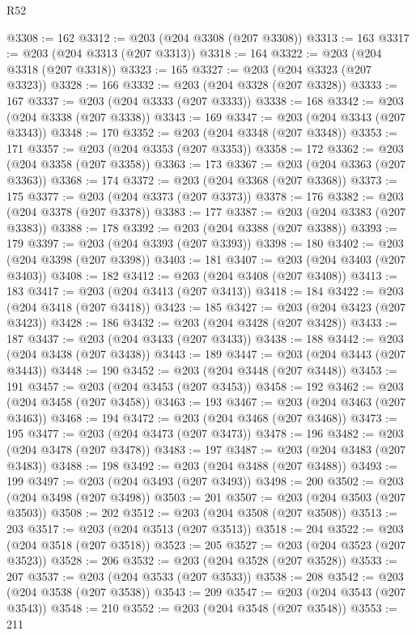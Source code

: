 \begin{lexlean}{R52}
\begin{coremodule}
@3308 := 162
@3312 := @203 (@204 @3308 (@207 @3308))
@3313 := 163
@3317 := @203 (@204 @3313 (@207 @3313))
@3318 := 164
@3322 := @203 (@204 @3318 (@207 @3318))
@3323 := 165
@3327 := @203 (@204 @3323 (@207 @3323))
@3328 := 166
@3332 := @203 (@204 @3328 (@207 @3328))
@3333 := 167
@3337 := @203 (@204 @3333 (@207 @3333))
@3338 := 168
@3342 := @203 (@204 @3338 (@207 @3338))
@3343 := 169
@3347 := @203 (@204 @3343 (@207 @3343))
@3348 := 170
@3352 := @203 (@204 @3348 (@207 @3348))
@3353 := 171
@3357 := @203 (@204 @3353 (@207 @3353))
@3358 := 172
@3362 := @203 (@204 @3358 (@207 @3358))
@3363 := 173
@3367 := @203 (@204 @3363 (@207 @3363))
@3368 := 174
@3372 := @203 (@204 @3368 (@207 @3368))
@3373 := 175
@3377 := @203 (@204 @3373 (@207 @3373))
@3378 := 176
@3382 := @203 (@204 @3378 (@207 @3378))
@3383 := 177
@3387 := @203 (@204 @3383 (@207 @3383))
@3388 := 178
@3392 := @203 (@204 @3388 (@207 @3388))
@3393 := 179
@3397 := @203 (@204 @3393 (@207 @3393))
@3398 := 180
@3402 := @203 (@204 @3398 (@207 @3398))
@3403 := 181
@3407 := @203 (@204 @3403 (@207 @3403))
@3408 := 182
@3412 := @203 (@204 @3408 (@207 @3408))
@3413 := 183
@3417 := @203 (@204 @3413 (@207 @3413))
@3418 := 184
@3422 := @203 (@204 @3418 (@207 @3418))
@3423 := 185
@3427 := @203 (@204 @3423 (@207 @3423))
@3428 := 186
@3432 := @203 (@204 @3428 (@207 @3428))
@3433 := 187
@3437 := @203 (@204 @3433 (@207 @3433))
@3438 := 188
@3442 := @203 (@204 @3438 (@207 @3438))
@3443 := 189
@3447 := @203 (@204 @3443 (@207 @3443))
@3448 := 190
@3452 := @203 (@204 @3448 (@207 @3448))
@3453 := 191
@3457 := @203 (@204 @3453 (@207 @3453))
@3458 := 192
@3462 := @203 (@204 @3458 (@207 @3458))
@3463 := 193
@3467 := @203 (@204 @3463 (@207 @3463))
@3468 := 194
@3472 := @203 (@204 @3468 (@207 @3468))
@3473 := 195
@3477 := @203 (@204 @3473 (@207 @3473))
@3478 := 196
@3482 := @203 (@204 @3478 (@207 @3478))
@3483 := 197
@3487 := @203 (@204 @3483 (@207 @3483))
@3488 := 198
@3492 := @203 (@204 @3488 (@207 @3488))
@3493 := 199
@3497 := @203 (@204 @3493 (@207 @3493))
@3498 := 200
@3502 := @203 (@204 @3498 (@207 @3498))
@3503 := 201
@3507 := @203 (@204 @3503 (@207 @3503))
@3508 := 202
@3512 := @203 (@204 @3508 (@207 @3508))
@3513 := 203
@3517 := @203 (@204 @3513 (@207 @3513))
@3518 := 204
@3522 := @203 (@204 @3518 (@207 @3518))
@3523 := 205
@3527 := @203 (@204 @3523 (@207 @3523))
@3528 := 206
@3532 := @203 (@204 @3528 (@207 @3528))
@3533 := 207
@3537 := @203 (@204 @3533 (@207 @3533))
@3538 := 208
@3542 := @203 (@204 @3538 (@207 @3538))
@3543 := 209
@3547 := @203 (@204 @3543 (@207 @3543))
@3548 := 210
@3552 := @203 (@204 @3548 (@207 @3548))
@3553 := 211

\end{coremodule}
\end{lexlean}
